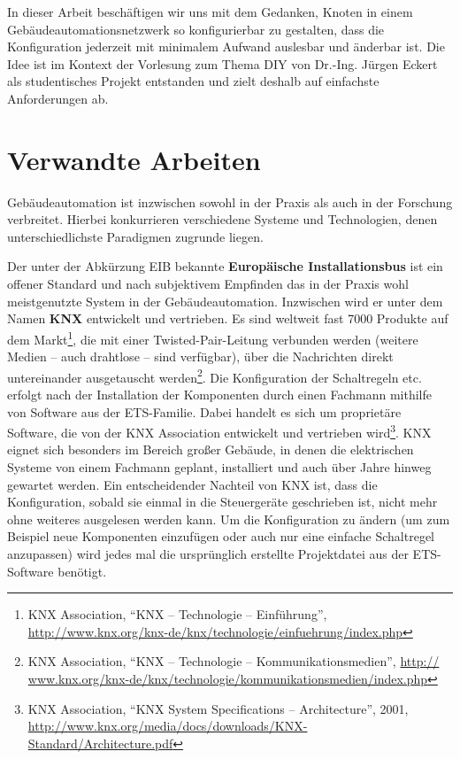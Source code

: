 \documentclass[conference]{IEEEtran}
\begin{document}
    In dieser Arbeit beschäftigen wir uns mit dem Gedanken,
    Knoten in einem Gebäudeautomationsnetzwerk so konfigurierbar zu gestalten,
    dass die Konfiguration jederzeit mit minimalem Aufwand auslesbar
    und änderbar ist.
    Die Idee ist im Kontext der Vorlesung zum Thema \ac{DIY}
    von Dr.-Ing. Jürgen Eckert als studentisches
    Projekt entstanden und zielt deshalb auf einfachste Anforderungen ab.

\section{Verwandte Arbeiten}
    Gebäudeautomation ist inzwischen sowohl in der Praxis
    als auch in der Forschung verbreitet. Hierbei konkurrieren verschiedene Systeme
    und Technologien, denen unterschiedlichste Paradigmen zugrunde liegen.

    Der unter der Abkürzung EIB bekannte \textbf{Europäische Installationsbus}
    ist ein offener Standard und nach subjektivem Empfinden das in der Praxis
    wohl meistgenutzte System in der Gebäudeautomation.
    Inzwischen wird er unter dem Namen \textbf{KNX} entwickelt und vertrieben.
    Es sind weltweit fast 7000 Produkte auf dem Markt\footnote{ KNX Association, \enquote{KNX -- Technologie -- Einführung}, \url{http://www.knx.org/knx-de/knx/technologie/einfuehrung/index.php}},
    die mit einer Twisted-Pair-Leitung verbunden werden
    (weitere Medien -- auch drahtlose -- sind verfügbar),
    über die Nachrichten direkt untereinander ausgetauscht werden\footnote{KNX Association, \enquote{KNX -- Technologie -- Kommunikationsmedien}, \url{http://
www.knx.org/knx-de/knx/technologie/kommunikationsmedien/index.php}}.
    Die Konfiguration der Schaltregeln etc. erfolgt nach der Installation
    der Komponenten durch einen Fachmann mithilfe von Software aus der
    ETS-Familie. Dabei handelt es sich um proprietäre Software,
    die von der KNX Association
    entwickelt und vertrieben wird\footnote{KNX Association,
        \enquote{KNX System Specifications -- Architecture}, 2001,
        \url{http://www.knx.org/media/docs/downloads/KNX-Standard/Architecture.pdf}}.
    KNX eignet sich besonders im Bereich großer Gebäude, in denen die
    elektrischen Systeme von einem Fachmann geplant, installiert und auch über
    Jahre hinweg gewartet werden. Ein entscheidender Nachteil von KNX ist,
    dass die Konfiguration, sobald sie einmal in die Steuergeräte geschrieben
    ist, nicht mehr ohne weiteres ausgelesen werden kann.
    Um die Konfiguration zu ändern (um zum Beispiel neue Komponenten einzufügen
    oder auch nur eine einfache Schaltregel anzupassen) wird jedes mal
    die ursprünglich erstellte Projektdatei aus der ETS-Software benötigt.
\end{document}
